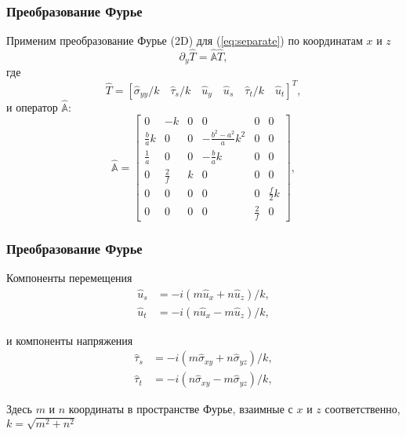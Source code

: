 \documentclass[10pt]{beamer}
\begin{document}
\begin{frame}
\frametitle{Преобразование Фурье}
Применим преобразование Фурье (2D) для (\ref{eq:separate}) по координатам $x$ и $z$
\begin{equation}
	\label{eq:FourierTransform}
	\partial_y \hat{T} = \hat{\mathbb{A}} \hat{T},
\end{equation}
где
\begin{equation}
	\label{eq:FourierT}
	\hat{T} = \left[\hat{\sigma}_{yy}/k \quad \hat{\tau}_s/k \quad \hat{u}_y \quad \hat{u}_s \quad  \hat{\tau}_t/k \quad  \hat{u}_t \right]^T,
\end{equation}
и оператор $\hat{\mathbb{A}}$:
\begin{equation}
	\label{eq:FourierA}
	\hat{\mathbb{A}} = 
	\left[\begin{array}{cccccc}
		0 & -k & 0 & 0 & 0 & 0 \\
		\frac{b}{a}k & 0 & 0 & -\frac{b^2-a^2}{a}k^2 & 0 & 0 \\
		\frac{1}{a} & 0 & 0 & -\frac{b}{a}k & 0 & 0 \\
		0 & \frac{2}{f} & k & 0 & 0 & 0 \\
		0 & 0 & 0 & 0 & 0 & \frac{f}{2}k \\
		0 & 0 & 0 & 0 & \frac{2}{f} & 0 
	\end{array}\right],
\end{equation}
\end{frame}



\begin{frame}
\frametitle{Преобразование Фурье}
Компоненты перемещения
\begin{equation}
	\label{eq:FourierDisplacment}
	\begin{split}
	\hat{u}_s & = -i \left( m\hat{u}_x + n\hat{u}_z \right) / k, \\
	\hat{u}_t & = -i \left( n\hat{u}_x - m\hat{u}_z \right) / k,
	\end{split}
\end{equation}

и компоненты напряжения
\begin{equation}
	\label{eq:FourierDisplacment}
	\begin{split}
	\hat{\tau}_s & = -i \left( m\hat{\sigma}_{xy} + n\hat{\sigma}_{yz} \right) / k, \\
	\hat{\tau}_t & = -i \left( n\hat{\sigma}_{xy} - m\hat{\sigma}_{yz} \right) / k,
	\end{split}
\end{equation}


Здесь $m$ и $n$ координаты в пространстве Фурье, взаимные с $x$ и $z$ соответственно, $k = \sqrt{m^2+n^2} $
\end{frame}
\end{document}
